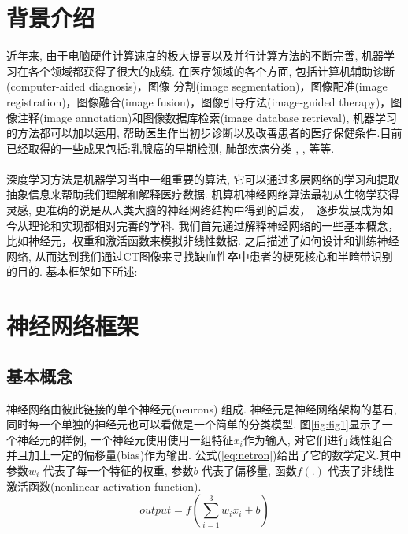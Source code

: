 \documentclass[12pt]{article}
\begin{document}
 
\begin{CJK*}{UTF8}{gbsn}


\section{背景介绍}




近年来,     由于电脑硬件计算速度的极大提高以及并行计算方法的不断完善,     机器学习在各个领域都获得了很大的成绩. 在医疗领域的各个方面,     包括计算机辅助诊断(computer-aided diagnosis)，图像
分割(image segmentation)，图像配准(image registration)，图像融合(image fusion)，图像引导疗法(image-guided therapy)，图像注释(image annotation)和图像数据库检索(image database retrieval),     机器学习的方法都可以加以运用,     帮助医生作出初步诊断以及改善患者的医疗保健条件.目前已经取得的一些成果包括:乳腺癌的早期检测\cite{tang2009computer},     肺部疾病分类 \cite{raghunath2013landscaping},     \cite{sluimer2006computer},     等等. \\
\\
深度学习方法是机器学习当中一组重要的算法,     它可以通过多层网络的学习和提取抽象信息来帮助我们理解和解释医疗数据. 机算机神经网络算法最初从生物学获得灵感,     更准确的说是从人类大脑的神经网络结构中得到的启发\cite{krenker2011introduction}，　逐步发展成为如今从理论和实现都相对完善的学科. 我们首先通过解释神经网络的一些基本概念，比如神经元，权重和激活函数来模拟非线性数据. 之后描述了如何设计和训练神经网络,     从而达到我们通过CT图像来寻找缺血性卒中患者的梗死核心和半暗带识别的目的. 基本框架如下所述:

\section{神经网络框架}

\subsection{基本概念}

神经网络由彼此链接的单个神经元(neurons) 组成. 神经元是神经网络架构的基石,    同时每一个单独的神经元也可以看做是一个简单的分类模型. 图\ref{fig:fig1}显示了一个神经元的样例,     一个神经元使用使用一组特征$x_i$作为输入,     对它们进行线性组合并且加上一定的偏移量(bias)作为输出. 公式(\ref{eq:netron})给出了它的数学定义.其中参数$w_i$ 代表了每一个特征的权重,     参数$b$ 代表了偏移量,     函数$f(.)$ 代表了非线性激活函数(nonlinear activation function). 
\begin{equation} \label{eq:netron}
output = f(\sum_{i=1}^3 w_ix_i+b)
\end{equation}


\end{CJK*}
\end{document}
